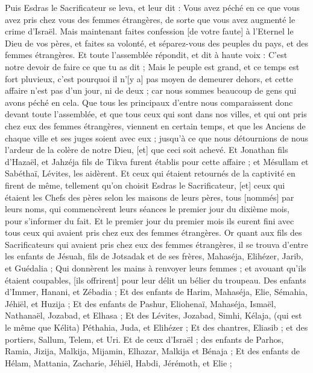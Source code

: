 \begin{multicols}{2}
Puis Esdras le Sacrificateur se leva, et leur dit : Vous avez péché en ce que vous avez pris chez vous des femmes étrangères, de sorte que vous avez augmenté le crime d'Israël.
Mais maintenant faites confession [de votre faute] à l'Eternel le Dieu de vos pères, et faites sa volonté, et séparez-vous des peuples du pays, et des femmes étrangères.
Et toute l'assemblée répondit, et dit à haute voix : C'est notre devoir de faire ce que tu as dit ;
Mais le peuple est grand, et ce temps est fort pluvieux, c'est pourquoi il n'[y a] pas moyen de demeurer dehors, et cette affaire n'est pas d'un jour, ni de deux ; car nous sommes beaucoup de gens qui avons péché en cela.
Que tous les principaux d'entre nous comparaissent donc devant toute l'assemblée, et que tous ceux qui sont dans nos villes, et qui ont pris chez eux des femmes étrangères, viennent en certain temps, et que les Anciens de chaque ville et ses juges soient avec eux ; jusqu'à ce que nous détournions de nous l'ardeur de la colère de notre Dieu, [et] que ceci soit achevé.
Et Jonathan fils d'Hazaël, et Jahzéja fils de Tikva furent établis pour cette affaire ; et Mésullam et Sabéthaï, Lévites, les aidèrent.
Et ceux qui étaient retournés de la captivité en firent de même, tellement qu'on choisit Esdras le Sacrificateur, [et] ceux qui étaient les Chefs des pères selon les maisons de leurs pères, tous [nommés] par leurs noms, qui commencèrent leurs séances le premier jour du dixième mois, pour s'informer du fait.
Et le premier jour du premier mois ils eurent fini avec tous ceux qui avaient pris chez eux des femmes étrangères.
Or quant aux fils des Sacrificateurs qui avaient pris chez eux des femmes étrangères, il se trouva d'entre les enfants de Jésuah, fils de Jotsadak et de ses frères, Mahaséja, Elihézer, Jarib, et Guédalia ;
Qui donnèrent les mains à renvoyer leurs femmes ; et avouant qu'ils étaient coupables, [ils offrirent] pour leur délit un bélier du troupeau.
Des enfants d'Immer, Hanani, et Zébadia ;
Et des enfants de Harim, Mahaséja, Elie, Sémahia, Jéhiël, et Huzija ;
Et des enfants de Pashur, Eliohenaï, Mahaséja, Ismaël, Nathanaël, Jozabad, et Elhasa ;
Et des Lévites, Jozabad, Simhi, Kélaja, (qui est le même que Kélita) Péthahia, Juda, et Elihézer ;
Et des chantres, Eliasib ; et des portiers, Sallum, Telem, et Uri.
Et de ceux d'Israël ; des enfants de Parhos, Ramia, Jizija, Malkija, Mijamin, Elhazar, Malkija et Bénaja ;
Et des enfants de Hélam, Mattania, Zacharie, Jéhiël, Habdi, Jérémoth, et Elie ;

\end{multicols}
